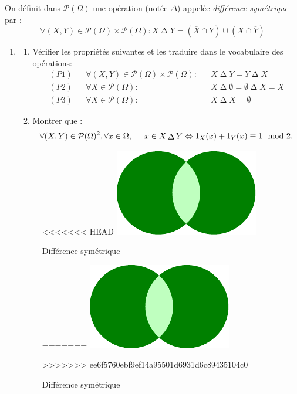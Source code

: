 On définit dans $\mathcal P(\Omega)$ une opération (notée $\Delta$) appelée \emph{différence symétrique} par :
\begin{displaymath}
 \forall (X,Y)\in \mathcal P(\Omega)\times \mathcal P(\Omega) :
X \mathop{\Delta} Y = (\overline{X}\cap Y)\cup(X \cap \overline{Y})
\end{displaymath}
\begin{enumerate}
 \item \begin{enumerate}
 \item Vérifier les propriétés suivantes et les traduire dans le vocabulaire des opérations:
\begin{align*}
(P1)& &\forall (X,Y)\in \mathcal P(\Omega)\times \mathcal P(\Omega) :& &X \mathop{\Delta} Y = Y \mathop{\Delta} X \\
(P2)& &\forall X \in \mathcal P(\Omega) :& &X \mathop{\Delta} \emptyset = \emptyset \mathop{\Delta} X = X\\
(P3)& &\forall X \in \mathcal P(\Omega) :& &X \mathop{\Delta} X = \emptyset 
\end{align*}
\item Montrer que :
\begin{displaymath}
\forall (X,Y)\in \mathcal P(\Omega)^2, \forall x\in \Omega,\hspace{0.5cm} x \in X \mathop{\Delta} Y \Leftrightarrow 1_X(x) + 1_Y(x) \equiv 1 \mod 2.  
\end{displaymath}

\end{enumerate}

\begin{figure}[ht]
 \centering
<<<<<<< HEAD
\includegraphics{./Ehamm_1.pdf}
\caption{Différence symétrique}
\label{fig:Ehamm_1}
=======
 \includegraphics{./Ehamm_1.pdf}
 \caption{Différence symétrique}
 \label{fig:Ehamm_1}
>>>>>>> ee6f5760ebf9ef14a95501d6931d6c89435104c0
\end{figure}


\end{enumerate}
